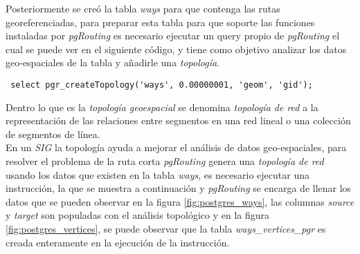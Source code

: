 

Posteriormente se creó la tabla \emph{ways} para que contenga las rutas georeferenciadas, para preparar esta tabla para que soporte las funciones instaladas por \emph{pgRouting} es necesario ejecutar un query propio de \emph{pgRouting} el cual se puede ver en el siguiente código, y tiene como objetivo analizar los datos geo-espaciales de la tabla y añadirle una \emph{topología}.\\


\begin{verbatim}
 select pgr_createTopology('ways', 0.00000001, 'geom', 'gid');
\end{verbatim}

Dentro lo que es la \emph{topología geoespacial} se denomina \emph{topología de red} a la representación de las relaciones entre segmentos en una red lineal o una colección de segmentos de línea. \cite{osgeo_journal_topology} \\

En un \emph{SIG} la topología ayuda a mejorar el análisis de datos geo-espaciales, para resolver el problema de la ruta corta \emph{pgRouting} genera una \emph{topología de red} usando los datos que existen en la tabla \emph{ways}, es necesario ejecutar una instrucción, la que se muestra a continuación y \emph{pgRouting} se encarga de llenar los datos que se pueden observar en la figura \ref{fig:postgres_ways}, las columnas \emph{source} y \emph{target} son populadas con el análisis topológico y en la figura \ref{fig:postgres_vertices}, se puede observar que la tabla \emph{ways\_vertices\_pgr} es creada enteramente en la ejecución de la instrucción.\\

